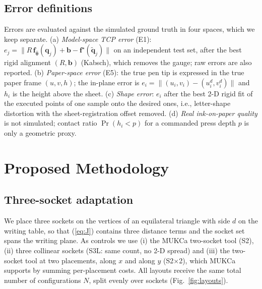 \documentclass[conference]{IEEEtran}
\begin{document}
\subsection{Error definitions}
Errors are evaluated against the simulated ground truth in four spaces, which we keep separate. (a) \emph{Model-space TCP
error} (E1): $e_j=\|R\,\mathbf f_{\hat{\boldsymbol\theta}}(\mathbf q_j)+\mathbf b-\mathbf f^\star(\tilde{\mathbf q}_j)\|$ on an
independent test set, after the best rigid alignment $(R,\mathbf b)$ (Kabsch), which removes the gauge; raw errors are
also reported. (b) \emph{Paper-space error} (E5): the true pen tip is expressed in the true paper frame
$(u,v,h)$; the in-plane error is $e_i=\|(u_i,v_i)-(u_i^{d},v_i^{d})\|$ and $h_i$ is the height above the sheet.
(c) \emph{Shape error}: $e_i$ after the best 2-D rigid fit of the executed points of one sample onto the desired ones,
i.e., letter-shape distortion with the sheet-registration offset removed. (d) \emph{Real ink-on-paper quality} is not
simulated; contact ratio $\Pr(h_i<p)$ for a commanded press depth $p$ is only a geometric proxy.

\section{Proposed Methodology}
\subsection{Three-socket adaptation}
We place three sockets on the vertices of an equilateral triangle with side $d$ on the writing table, so that (\ref{eq:J})
contains three distance terms and the socket set spans the writing plane. As controls we use (i) the MUKCa two-socket tool
(S2), (ii) three collinear sockets (S3L: same count, no 2-D spread) and (iii) the two-socket tool at two placements, along $x$
and along $y$ (S2$\times$2), which MUKCa supports by summing per-placement costs. All layouts receive the same total number of
configurations $N$, split evenly over sockets (Fig.~\ref{fig:layouts}).
\end{document}
